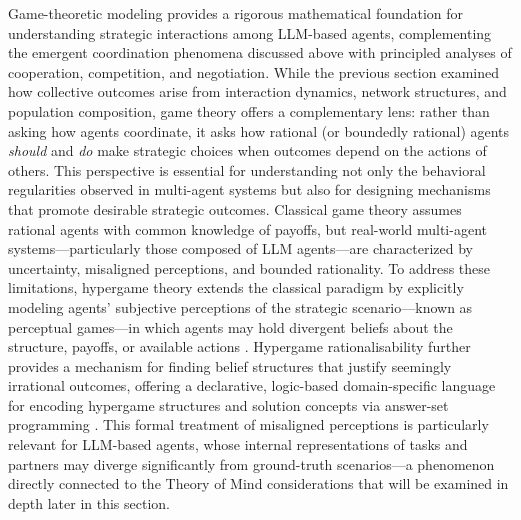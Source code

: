 \documentclass[11pt]{article}
\begin{document}
Game-theoretic modeling provides a rigorous mathematical foundation for understanding strategic interactions among LLM-based agents, complementing the emergent coordination phenomena discussed above with principled analyses of cooperation, competition, and negotiation. While the previous section examined how collective outcomes arise from interaction dynamics, network structures, and population composition, game theory offers a complementary lens: rather than asking how agents coordinate, it asks how rational (or boundedly rational) agents \emph{should} and \emph{do} make strategic choices when outcomes depend on the actions of others. This perspective is essential for understanding not only the behavioral regularities observed in multi-agent systems but also for designing mechanisms that promote desirable strategic outcomes. Classical game theory assumes rational agents with common knowledge of payoffs, but real-world multi-agent systems---particularly those composed of LLM agents---are characterized by uncertainty, misaligned perceptions, and bounded rationality. To address these limitations, hypergame theory extends the classical paradigm by explicitly modeling agents' subjective perceptions of the strategic scenario---known as perceptual games---in which agents may hold divergent beliefs about the structure, payoffs, or available actions \cite{ref215}. Hypergame rationalisability further provides a mechanism for finding belief structures that justify seemingly irrational outcomes, offering a declarative, logic-based domain-specific language for encoding hypergame structures and solution concepts via answer-set programming \cite{ref216}. This formal treatment of misaligned perceptions is particularly relevant for LLM-based agents, whose internal representations of tasks and partners may diverge significantly from ground-truth scenarios---a phenomenon directly connected to the Theory of Mind considerations that will be examined in depth later in this section.
\end{document}
